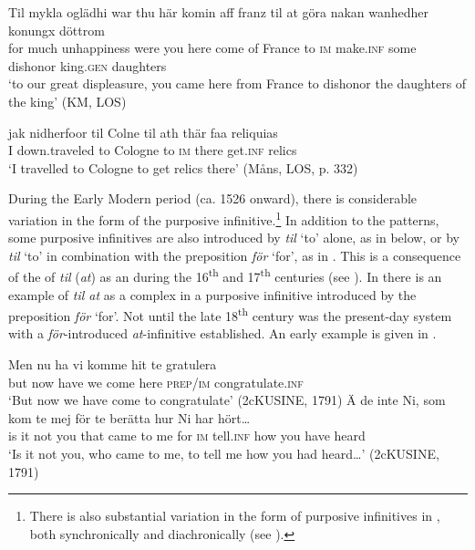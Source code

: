 \documentclass[output=paper]{langscibook}
\begin{document}
\ea
\label{ex:kalm:10}
\ea  \label{ex:kalm:10a}
\gll Til mykla oglädhi war thu här komin aff franz til at göra nakan wanhedher konungx döttrom\\
for much unhappiness were you here come of France to \textsc{im} make.\textsc{inf} some dishonor king.\textsc{gen} daughters\\
\glt ‘to our great displeasure, you came here from France to dishonor the daughters of the king’ (KM, LOS)

\ex\label{ex:kalm:10b}
\gll jak nidherfoor til Colne til ath thär faa reliquias\\
 I down.traveled to Cologne to \textsc{im} there get.\textsc{inf} relics\\
\glt ‘I travelled to Cologne to get relics there’ (Måns, LOS, p. 332)
\z 
\z 


During the Early Modern period (ca. 1526 onward), there is considerable variation in the form of the purposive infinitive.\footnote{There is also substantial variation in the form of purposive infinitives in , both synchronically and diachronically (see \citealt{Demske2011}).}  In addition to the  patterns, some purposive infinitives are also introduced by \textit{til} ‘to’ alone, as in  below, or by \textit{til} ‘to’ in combination with the preposition \textit{för} ‘for’, as in . This is a consequence of the  of \textit{til} (\textit{at}) as an  during the 16\textsuperscript{th} and 17\textsuperscript{th} centuries (see \cites[]{Kalm2014}[]{Kalm2016Prepositioner}[203–221]{Kalm2016Satsekvivalenta}). In  there is an example of \textit{til at} as a complex  in a purposive infinitive introduced by the preposition \textit{för} ‘for’. Not until the late 18\textsuperscript{th} century was the present-day system with a \textit{för}{}-introduced \textit{at}{}-infinitive established. An early example is given in . 


\ea
\label{ex:kalm:11}
\ea  \label{ex:kalm:11a}
\gll Men nu ha vi komme hit te gratulera\\
but now have we come here \textsc{prep}/\textsc{im} congratulate.\textsc{inf}\\
\glt ‘But now we have come to congratulate’ (2cKUSINE, 1791) 
\ex  \label{ex:kalm:11b}
\gll Ä de inte Ni, som kom te mej för te berätta hur Ni har hört…\\
is it not you that came to me for \textsc{im} tell.\textsc{inf} how you have heard\\
\glt ‘Is it not you, who came to me, to tell me how you had heard…’ (2cKUSINE, 1791)
\end{document}
